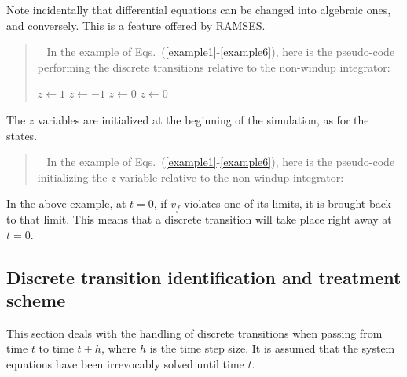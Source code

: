 Note incidentally that differential equations can be changed into algebraic ones, and conversely. This is a feature offered by RAMSES.

\begin{quote}
\rm 
\faHandPointRight ~ In the example of Eqs.~(\ref{example1}-\ref{example6}), here is the pseudo-code performing the discrete transitions relative to the non-windup integrator:
\vspace*{2ex}
\begin{algorithmic}
    \STATE $z \gets 1$
    \STATE $z \leftarrow -1$
  \ENDIF
{}
    \STATE $z \gets 0$
  \ENDIF
{}
    \STATE $z \gets 0$
  \ENDIF
\ENDIF
\end{algorithmic}
\end{quote}

The $z$ variables are initialized at the beginning of the simulation, as for the states.

\begin{quote}
\rm 
\faHandPointRight ~ In the example of Eqs.~(\ref{example1}-\ref{example6}), here is the pseudo-code initializing the $z$ variable relative to the non-windup integrator:
\vspace*{2ex}
\begin{algorithmic} 
\ELSE
\ENDIF
\end{algorithmic}
\end{quote}

In the above example, at $t=0$, if $v_f$ violates one of its limits, it is brought back to that limit. This means that a discrete transition will take place right away at $t=0$.


\subsection{Discrete transition identification and treatment scheme}

This section deals with the handling of discrete transitions when passing from time $t$ to time $t+h$, where $h$ is the time step size. It is assumed that the system equations have been irrevocably solved until time $t$.


